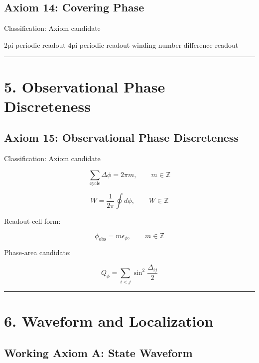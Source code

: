 \documentclass[
  a4paper,
]{article}
\newenvironment{Shaded}{}{}
\newcommand{\NormalTok}[1]{#1}
\begin{document}
\subsection{Axiom 14: Covering Phase}\label{axiom-14-covering-phase}

Classification: Axiom candidate

\begin{Shaded}
\begin{Highlighting}[]
\NormalTok{2pi{-}periodic readout}
\NormalTok{4pi{-}periodic readout}
\NormalTok{winding{-}number{-}difference readout}
\end{Highlighting}
\end{Shaded}

\begin{center}\rule{0.5\linewidth}{0.5pt}\end{center}

\section{5. Observational Phase
Discreteness}\label{observational-phase-discreteness}

\subsection{Axiom 15: Observational Phase
Discreteness}\label{axiom-15-observational-phase-discreteness}

Classification: Axiom candidate

\[
\sum_{\mathrm{cycle}}\Delta\phi=2\pi m,\qquad m\in\mathbb{Z}
\]

\[
W=\frac{1}{2\pi}\oint d\phi,\qquad W\in\mathbb{Z}
\]

Readout-cell form:

\[
\phi_{\mathrm{obs}}=m\epsilon_\phi,\qquad m\in\mathbb{Z}
\]

Phase-area candidate:

\[
Q_\phi=\sum_{i<j}\sin^2\frac{\Delta_{ij}}{2}
\]

\begin{center}\rule{0.5\linewidth}{0.5pt}\end{center}

\section{6. Waveform and Localization}\label{waveform-and-localization}

\subsection{Working Axiom A: State
Waveform}\label{working-axiom-a-state-waveform}
\end{document}
